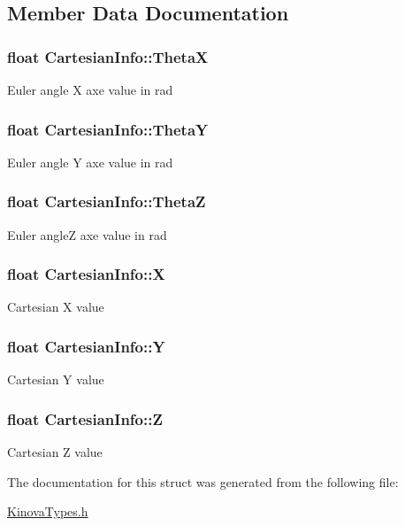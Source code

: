 \subsection{Member Data Documentation}
\hypertarget{struct_cartesian_info_a39135e53155aa4025c40eeefbfd3b17c}{
\subsubsection[{Theta\-X}]{\setlength{\rightskip}{0pt plus 5cm}float Cartesian\-Info\-::\-Theta\-X}}\label{struct_cartesian_info_a39135e53155aa4025c40eeefbfd3b17c}
Euler angle X axe value in rad \hypertarget{struct_cartesian_info_a4aef5897f4cdcf7ecc9df6804f844d46}{
\subsubsection[{Theta\-Y}]{\setlength{\rightskip}{0pt plus 5cm}float Cartesian\-Info\-::\-Theta\-Y}}\label{struct_cartesian_info_a4aef5897f4cdcf7ecc9df6804f844d46}
Euler angle Y axe value in rad \hypertarget{struct_cartesian_info_a2890c501f3b7b9479e12ad51f04f0a7f}{
\subsubsection[{Theta\-Z}]{\setlength{\rightskip}{0pt plus 5cm}float Cartesian\-Info\-::\-Theta\-Z}}\label{struct_cartesian_info_a2890c501f3b7b9479e12ad51f04f0a7f}
Euler angle\-Z axe value in rad \hypertarget{struct_cartesian_info_a212cc2dcae1697132fc31fa2f5d17269}{
\subsubsection[{X}]{\setlength{\rightskip}{0pt plus 5cm}float Cartesian\-Info\-::\-X}}\label{struct_cartesian_info_a212cc2dcae1697132fc31fa2f5d17269}
Cartesian X value \hypertarget{struct_cartesian_info_a12c2611c89445419b336e58815d87c7c}{
\subsubsection[{Y}]{\setlength{\rightskip}{0pt plus 5cm}float Cartesian\-Info\-::\-Y}}\label{struct_cartesian_info_a12c2611c89445419b336e58815d87c7c}
Cartesian Y value \hypertarget{struct_cartesian_info_a14e196e4cb38c0ae7f4658b9b070b7fe}{
\subsubsection[{Z}]{\setlength{\rightskip}{0pt plus 5cm}float Cartesian\-Info\-::\-Z}}\label{struct_cartesian_info_a14e196e4cb38c0ae7f4658b9b070b7fe}
Cartesian Z value 

The documentation for this struct was generated from the following file\-:\begin{DoxyCompactItemize}
\item 
\hyperlink{_kinova_types_8h}{Kinova\-Types.\-h}\end{DoxyCompactItemize}
